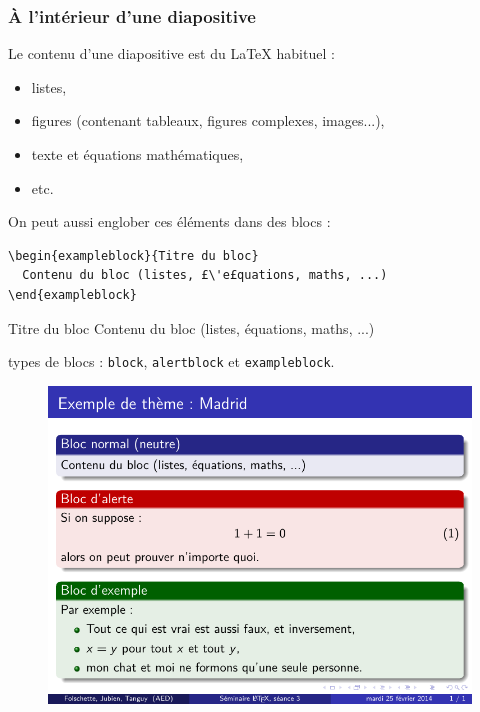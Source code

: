 \begin{frame}[fragile]
  \frametitle{À l'intérieur d'une diapositive}

Le contenu d'une diapositive est du \LaTeX{} habituel :
\begin{itemize}
  \item listes,
  \item figures (contenant tableaux, figures complexes, images...),
  \item texte et équations mathématiques,
  \item etc.
\end{itemize}

\medskip
On peut aussi englober ces éléments dans des blocs :
\begin{lstlisting}
\begin{exampleblock}{Titre du bloc}
  Contenu du bloc (listes, £\'e£quations, maths, ...)
\end{exampleblock}
\end{lstlisting}

\begin{exampleblock}{Titre du bloc}
  Contenu du bloc (listes, équations, maths, ...)
\end{exampleblock}

 types de blocs : \lstinline?block?, \lstinline?alertblock? et \lstinline?exampleblock?.
\end{frame}



\begin{frame}[plain]
\begin{figure}
  \centering
  \includegraphics[width=1\textwidth]{img/seance3_extheme_madrid}
\end{figure}
\end{frame}



